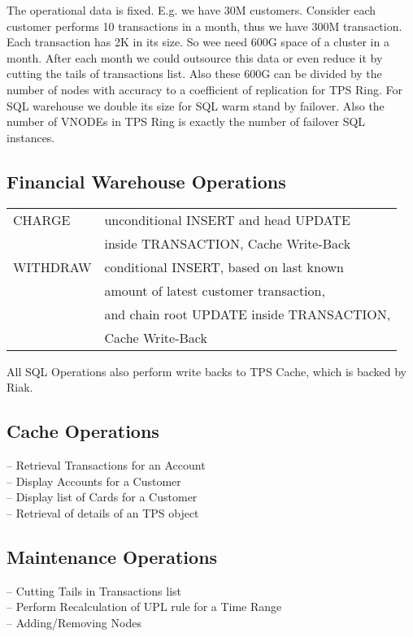 The operational data is fixed. E.g. we have 30M customers.
Consider each customer performs 10 transactions in a month,
thus we have 300M transaction. Each transaction has 2K in its size.
So wee need 600G space of a cluster in a month.
After each month we could outsource this data or even reduce it
by cutting the tails of transactions list. Also these 600G can be divided
by the number of nodes with accuracy to a coefficient of replication for TPS Ring.
For SQL warehouse we double its size for SQL warm stand by failover.
Also the number of VNODEs in TPS Ring is exactly the number of failover SQL instances.

\subsection{Financial Warehouse Operations}

\begin{tabular}{ll}
CHARGE   & unconditional INSERT and head UPDATE \\
         & inside TRANSACTION, Cache Write-Back\\
WITHDRAW & conditional INSERT, based on last known \\
         & amount of latest customer transaction,\\
         & and chain root UPDATE inside TRANSACTION,\\
         & Cache Write-Back\\
\end{tabular}

All SQL Operations also perform write backs to TPS Cache, which is backed by Riak.

\subsection{Cache Operations}

\vbox{
-- Retrieval Transactions for an Account\\
-- Display Accounts for a Customer\\
-- Display list of Cards for a Customer\\
-- Retrieval of details of an TPS object\\
}

\subsection{Maintenance Operations}

\vbox{
-- Cutting Tails in Transactions list\\
-- Perform Recalculation of UPL rule for a Time Range\\
-- Adding/Removing Nodes\\
}

